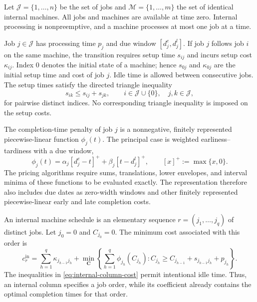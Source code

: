 Let $\mathcal J=\{1,\ldots,n\}$ be the set of jobs and
$\mathcal M=\{1,\ldots,m\}$ the set of identical internal machines. All jobs and
machines are available at time zero. Internal processing is nonpreemptive, and a
machine processes at most one job at a time.

Job $j\in\mathcal J$ has processing time $p_j$ and due window
$[d_j^e,d_j^l]$. If job $j$ follows job $i$ on the same machine, the transition
requires setup time $s_{ij}$ and incurs setup cost $\kappa_{ij}$. Index $0$
denotes the initial state of a machine; hence $s_{0j}$ and $\kappa_{0j}$ are the
initial setup time and cost of job $j$. Idle time is allowed between consecutive
jobs. The setup times satisfy the directed triangle inequality
\begin{equation}
    s_{ik}\le s_{ij}+s_{jk},
    \qquad
    i\in\mathcal J\cup\{0\},\quad j,k\in\mathcal J,
    \label{eq:setup-time-triangle}
\end{equation}
for pairwise distinct indices. No corresponding triangle inequality is imposed on
the setup costs.

The completion-time penalty of job $j$ is a nonnegative, finitely represented
piecewise-linear function $\phi_j(t)$. The principal case is weighted
earliness--tardiness with a due window,
\begin{equation}
    \phi_j(t)
    =
    \alpha_j[d_j^e-t]^+
    +
    \beta_j[t-d_j^l]^+,
    \qquad [x]^+:=\max\{x,0\}.
    \label{eq:due-window-penalty}
\end{equation}
The pricing algorithms require sums, translations, lower envelopes, and interval
minima of these functions to be evaluated exactly. The representation therefore
also includes due dates as zero-width windows and other finitely represented
piecewise-linear early and late completion costs.

An internal machine schedule is an elementary sequence
$r=(j_1,\ldots,j_q)$ of distinct jobs. Let $j_0=0$ and $C_{j_0}=0$. The minimum
cost associated with this order is
\begin{equation}
    c_r^{\mathrm{in}}
    =
    \sum_{h=1}^{q}\kappa_{j_{h-1}j_h}
    +
    \min_{\boldsymbol C}
    \left\{
        \sum_{h=1}^{q}\phi_{j_h}(C_{j_h})
        :
        C_{j_h}\ge
        C_{j_{h-1}}+s_{j_{h-1}j_h}+p_{j_h}
    \right\}.
    \label{eq:internal-column-cost}
\end{equation}
The inequalities in \eqref{eq:internal-column-cost} permit intentional idle time.
Thus, an internal column specifies a job order, while its coefficient already
contains the optimal completion times for that order.


